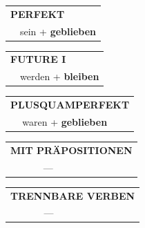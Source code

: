 \documentclass[10pt,a4paper]{revtex4-2}
\begin{document}
\begin{verbbox}
    \vspace{10pt}

 \begin{tabular}{rl}
     \multicolumn{2}{l}{\textbf{PERFEKT}}\\
  &  sein + \textbf{geblieben}\\
  \end{tabular}
\hfill
   \begin{tabular}{rl}
   
    \multicolumn{2}{l}{\textbf{FUTURE I} }\\
  &  werden + \textbf{bleiben}\\
 
  \end{tabular}
\hfill
   \begin{tabular}{rl}
      \multicolumn{2}{l}{\textbf{PLUSQUAMPERFEKT}}\\
  &  waren + \textbf{geblieben}\\
  \end{tabular}
  
  \vspace{10pt}

\begin{tabular}{lll}
\multicolumn{3}{l}{\textbf{MIT PRÄPOSITIONEN}}\\
& ---\\
\end{tabular}
\hfill
\begin{tabular}{lll}
\multicolumn{3}{l}{\textbf{TRENNBARE VERBEN}}\\
& ---\\
\end{tabular}

  \vspace{-5pt}


\end{verbbox}
\end{document}
